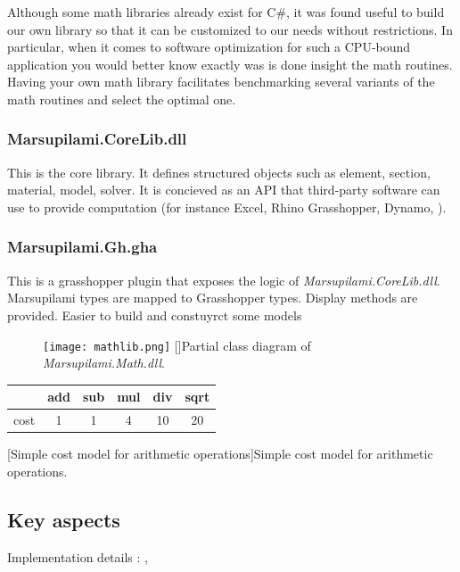 Although some math libraries already exist for C\#, it was found useful to build our own library so that it can be customized to our needs without restrictions. In particular, when it comes to software optimization for such a CPU-bound application you would better know exactly was is done insight the math routines. Having your own math library facilitates benchmarking several variants of the math routines and select the optimal one.
 

 

\subsubsection{Marsupilami.CoreLib.dll}
This is the core library. It defines structured objects such as element, section, material, model, solver. It is concieved as an API that third-party software can use to provide computation (for instance Excel, Rhino Grasshopper, Dynamo, \telp{}).

\subsubsection{Marsupilami.Gh.gha}
This is a grasshopper plugin that exposes the logic of \textit{Marsupilami.CoreLib.dll}. Marsupilami types are mapped to Grasshopper types. Display methods are provided. Easier to build and constuyrct some models

\begin{figure}[t]
     	\centering
	\texttt{[image: mathlib.png]}
	[]{Partial class diagram of \textit{Marsupilami.Math.dll}.}
	\label{fig:mathlib} 
\end{figure}

\begin{table}
\center
	\begin{tabularx}{0.4\textwidth}{@{} X ccccc @{}}
		\toprule
		 	& add 	& sub 	& mul 	& div 	& sqrt \\
		\midrule
		cost	& 1 		& 1 		& 4 		& 10 		& 20	\\
		\bottomrule	
	\end{tabularx}
	\label{tab:count}
	\vspace{10pt}
	[Simple cost model for arithmetic operations]{Simple cost model for arithmetic operations.}
	\label{tab:costmodel}
\end{table}

\subsection{Key aspects}
Implementation details : \cite{Olsson2012}, \cite{Poulsen2015}


